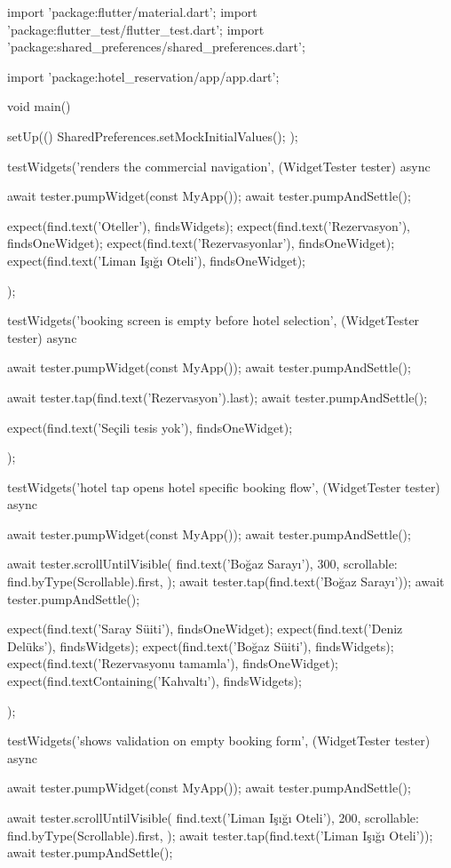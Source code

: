 \documentclass[11pt,a4paper]{article}
\begin{document}
\begin{codeblock}
import 'package:flutter/material.dart';
import 'package:flutter_test/flutter_test.dart';
import 'package:shared_preferences/shared_preferences.dart';

import 'package:hotel_reservation/app/app.dart';

void main() {
  setUp(() {
    SharedPreferences.setMockInitialValues({});
  });

  testWidgets('renders the commercial navigation', (WidgetTester tester) async {
    await tester.pumpWidget(const MyApp());
    await tester.pumpAndSettle();

    expect(find.text('Oteller'), findsWidgets);
    expect(find.text('Rezervasyon'), findsOneWidget);
    expect(find.text('Rezervasyonlar'), findsOneWidget);
    expect(find.text('Liman Işığı Oteli'), findsOneWidget);
  });

  testWidgets('booking screen is empty before hotel selection',
      (WidgetTester tester) async {
    await tester.pumpWidget(const MyApp());
    await tester.pumpAndSettle();

    await tester.tap(find.text('Rezervasyon').last);
    await tester.pumpAndSettle();

    expect(find.text('Seçili tesis yok'), findsOneWidget);
  });

  testWidgets('hotel tap opens hotel specific booking flow',
      (WidgetTester tester) async {
    await tester.pumpWidget(const MyApp());
    await tester.pumpAndSettle();

    await tester.scrollUntilVisible(
      find.text('Boğaz Sarayı'),
      300,
      scrollable: find.byType(Scrollable).first,
    );
    await tester.tap(find.text('Boğaz Sarayı'));
    await tester.pumpAndSettle();

    expect(find.text('Saray Süiti'), findsOneWidget);
    expect(find.text('Deniz Delüks'), findsWidgets);
    expect(find.text('Boğaz Süiti'), findsWidgets);
    expect(find.text('Rezervasyonu tamamla'), findsOneWidget);
    expect(find.textContaining('Kahvaltı'), findsWidgets);
  });

  testWidgets('shows validation on empty booking form',
      (WidgetTester tester) async {
    await tester.pumpWidget(const MyApp());
    await tester.pumpAndSettle();

    await tester.scrollUntilVisible(
      find.text('Liman Işığı Oteli'),
      200,
      scrollable: find.byType(Scrollable).first,
    );
    await tester.tap(find.text('Liman Işığı Oteli'));
    await tester.pumpAndSettle();

}}
\end{codeblock}
\end{document}

